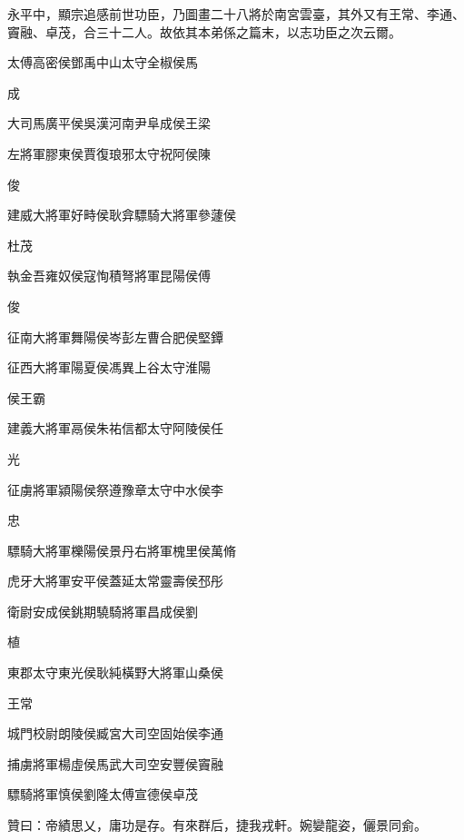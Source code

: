 \begin{pinyinscope}
永平中，顯宗追感前世功臣，乃圖畫二十八將於南宮雲臺，其外又有王常、李通、竇融、卓茂，合三十二人。故依其本弟係之篇末，以志功臣之次云爾。

太傅高密侯鄧禹中山太守全椒侯馬

成

大司馬廣平侯吳漢河南尹阜成侯王梁

左將軍膠東侯賈復琅邪太守祝阿侯陳

俊

建威大將軍好畤侯耿弇驃騎大將軍參蘧侯

杜茂

執金吾雍奴侯寇恂積弩將軍昆陽侯傅

俊

征南大將軍舞陽侯岑彭左曹合肥侯堅鐔

征西大將軍陽夏侯馮異上谷太守淮陽

侯王霸

建義大將軍鬲侯朱祐信都太守阿陵侯任

光

征虜將軍潁陽侯祭遵豫章太守中水侯李

忠

驃騎大將軍櫟陽侯景丹右將軍槐里侯萬脩

虎牙大將軍安平侯蓋延太常靈壽侯邳彤

衛尉安成侯銚期驍騎將軍昌成侯劉

植

東郡太守東光侯耿純橫野大將軍山桑侯

王常

城門校尉朗陵侯臧宮大司空固始侯李通

捕虜將軍楊虛侯馬武大司空安豐侯竇融

驃騎將軍慎侯劉隆太傅宣德侯卓茂

贊曰：帝績思乂，庸功是存。有來群后，捷我戎軒。婉孌龍姿，儷景同侴。


\end{pinyinscope}